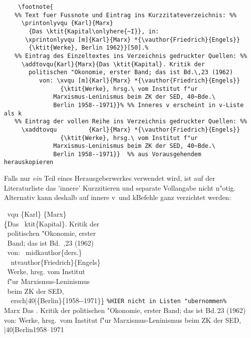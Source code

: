 \documentclass[12pt,a4paper]{article}
\newcommand{\pbs}{\string\ \unskip}
\newcommand{\bs}{\protect\pbs}
\begin{document}
\vspace{-.5ex}
{\footnotesize
  \begin{verbatim}
    \footnote{
   %% Text fuer Fussnote und Eintrag ins Kurzzitateverzeichnis: %%
     \printonlyvqu {Karl}{Marx} 
       {Das \ktit{Kapital\onlyhere{~I}}, in: 
      \xprintonlyvqu [m]{Karl}{Marx} *{\vauthor{Friedrich}{Engels}} 
       {\ktit{Werke}, Berlin 1962}}[50].%
   %% Eintrag des Einzeltextes ins Verzeichnis gedruckter Quellen: %%
     \addtovqu{Karl}{Marx}{Das \ktit{Kapital}. Kritik der 
       politischen "Okonomie, erster Band; das ist Bd.\,23 (1962) 
          von: \xvqu [m]{Karl}{Marx} *{\vauthor{Friedrich}{Engels}} 
                {\ktit{Werke}, hrsg.\ vom Institut f"ur 
              Marxismus-Leninismus beim ZK der SED, 40~Bde.\ 
              Berlin 1958--1971}}% %% Inneres v erscheint in v-Liste als k
   %% Eintrag der vollen Reihe ins Verzeichnis gedruckter Quellen: %%
     \xaddtovqu         {Karl}{Marx} *{\vauthor{Friedrich}{Engels}} 
                {\ktit{Werke}, hrsg.\ vom Institut f"ur 
              Marxismus-Leninismus beim ZK der SED, 40~Bde.\ 
              Berlin 1958--1971}}  %% aus Vorausgehendem herauskopieren
\end{verbatim}}

\noindent
Falls nur \textit{ein} Teil eines Herausgeberwerkes verwendet wird,
ist auf der Literaturliste das 'innere' Kurzzitieren und separate 
Vollangabe nicht n"otig. Alternativ kann deshalb auf 
innere v\hy\ und k\fhy Befehle ganz verzichtet werden:

\Doppelbox
{\bs vqu \{Karl\} \{Marx\} 
 \\ \b{\{}Das \bs ktit\{Kapital\}. Kritik der 
 \\ \ politischen "Okonomie, erster 
 \\ \ Band; das ist Bd.\bs,23 (1962) 
 \\ \ von: \bs midkauthor\{ders.\} 
 \\ \ \bs ntvauthor\{Friedrich\}\{Engels\}
 \\ \ Werke, hrsg. vom Institut 
 \\ \ f"ur Marxismus-Leninismus 
 \\ \ beim ZK der SED, 
 \\ \ \bs ersch\string|40\string|\{Berlin\}\{1958-{}-1971\}\b{\}}
}
{\footnotesize\notktitaddtok
 \texttt{\%HIER nicht in Listen "ubernommen\%}
 \\[.5ex]  {Marx} {Das . Kritik der politischen 
 "Okonomie, erster Band; das ist Bd.\,23 (1962) von: 
 \midkauthor{ders.} \ntvauthor{Friedrich}{Engels} 
 Werke, hrsg.\ vom Institut f"ur 
 Marxismus-Leninismus beim ZK der SED, 
 \ersch|40|{Berlin}{1958--1971}}
}
\end{document}
